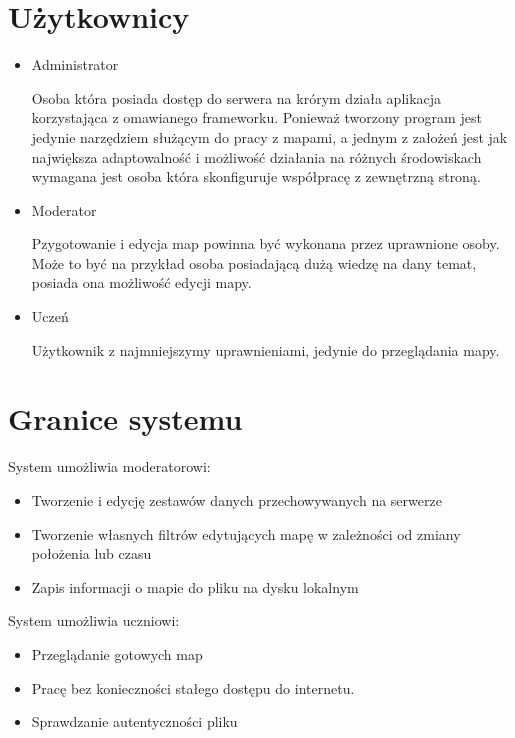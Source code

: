 \section{Użytkownicy}
\label{sec:uzytkownicy}

\begin{itemize}
\item
Administrator

Osoba która posiada dostęp do serwera na krórym działa aplikacja korzystająca z omawianego frameworku. Ponieważ tworzony program jest jedynie narzędziem służącym do pracy z mapami, a jednym z założeń jest jak największa adaptowalność i możliwość działania na różnych środowiskach wymagana jest osoba która skonfiguruje współpracę z zewnętrzną stroną.

\item
Moderator

Pzygotowanie i edycja map powinna być wykonana przez uprawnione osoby. Może to być na przykład osoba posiadającą dużą wiedzę na dany temat, posiada ona możliwość edycji mapy.
\item
Uczeń

Użytkownik z najmniejszymy uprawnieniami, jedynie do przeglądania mapy.
\end{itemize}

\section{Granice systemu}
\label{sec:granicesystemu}

System umożliwia moderatorowi:
\begin{itemize}
\item
Tworzenie i edycję zestawów danych przechowywanych na serwerze

\item
Tworzenie własnych filtrów edytujących mapę w zależności od zmiany położenia lub czasu

\item
Zapis informacji o mapie do pliku na dysku lokalnym

\end{itemize}

System umożliwia uczniowi:
\begin{itemize}
\item
Przeglądanie gotowych map

\item
Pracę bez konieczności stałego dostępu do internetu.

\item
Sprawdzanie autentyczności pliku

\end{itemize}

